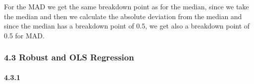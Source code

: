 \documentclass[11pt]{article}
\begin{document}
For the MAD we get the same breakdown point as for the median, since we
take the median and then we calculate the absolute deviation from the
median and since the median has a breakdown point of 0.5, we get also a
breakdown point of 0.5 for MAD.

    \hypertarget{robust-and-ols-regression}{%
\subsubsection{4.3 Robust and OLS
Regression}\label{robust-and-ols-regression}}

    \hypertarget{section}{%
\paragraph{4.3.1}\label{section}}
\end{document}
